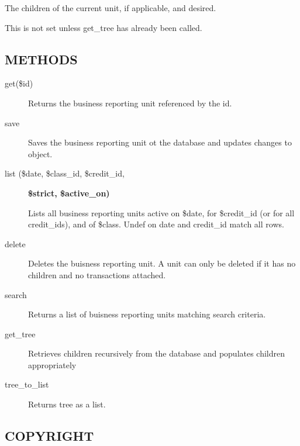\begin{description}
\begin{description}
\begin{description}
\begin{description}
\begin{description}
\begin{description}
\begin{description}
\begin{description}
\begin{description}
\begin{description}
\begin{description}
The children of the current unit, if applicable, and desired.



This is not set unless get\_tree has already been called.

\end{description}
\subsection*{METHODS\label{LedgerSMB::DBObject::Business_Unit_Class_METHODS}}
\begin{description}

\item[{get(\$id)}] \mbox{}

Returns the business reporting unit referenced by the id.


\item[{save}] \mbox{}

Saves the business reporting unit ot the database and updates changes to object.


\item[{list (\$date, \$class\_id, \$credit\_id,}] \textbf{\$strict, \$active\_on)}

Lists all business reporting units active on \$date, for \$credit\_id (or for all
credit\_ids), and of \$class.  Undef on date and credit\_id match all rows.


\item[{delete}] \mbox{}

Deletes the buisness reporting unit.  A unit can only be deleted if it has no 
children and no transactions attached.


\item[{search}] \mbox{}

Returns a list of buisness reporting units matching search criteria.


\item[{get\_tree}] \mbox{}

Retrieves children recursively from the database and populates children 
appropriately


\item[{tree\_to\_list}] \mbox{}

Returns tree as a list.

\end{description}
\subsection*{COPYRIGHT\label{LedgerSMB::DBObject::Business_Unit_Class_COPYRIGHT}}



\end{description}
\end{description}
\end{description}
\end{description}
\end{description}
\end{description}
\end{description}
\end{description}
\end{description}
\end{description}

